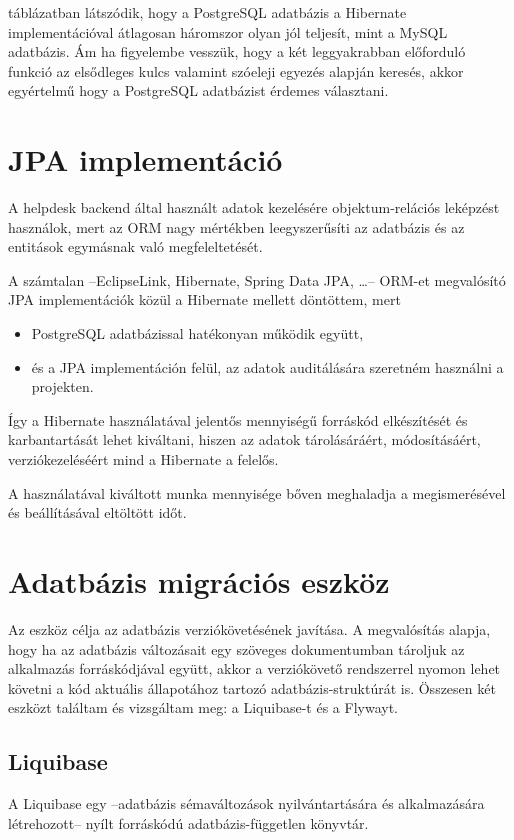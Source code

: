  táblázatban látszódik, hogy a PostgreSQL adatbázis a Hibernate implementációval átlagosan háromszor olyan jól teljesít, mint a MySQL adatbázis. Ám ha figyelembe vesszük, hogy a két leggyakrabban előforduló funkció az elsődleges kulcs valamint szóeleji egyezés alapján keresés, akkor egyértelmű hogy a PostgreSQL adatbázist érdemes választani.


\section{JPA implementáció}
A helpdesk backend által használt adatok kezelésére objektum-relációs leképzést használok, mert az ORM nagy mértékben leegyszerűsíti az adatbázis és az entitások egymásnak való megfeleltetését.


A számtalan --EclipseLink, Hibernate, Spring Data JPA, \dots-- ORM-et megvalósító JPA implementációk közül a Hibernate mellett döntöttem, mert
\begin{itemize}
	\item PostgreSQL adatbázissal hatékonyan működik együtt,
	\item és a JPA implementáción felül, az adatok auditálására szeretném használni a projekten.
\end{itemize}

Így a Hibernate használatával jelentős mennyiségű forráskód elkészítését és karbantartását lehet kiváltani, hiszen az adatok tárolásáráért, módosításáért, verziókezeléséért mind a Hibernate a felelős.

A használatával kiváltott munka mennyisége bőven meghaladja a megismerésével és beállításával eltöltött időt.


\section{Adatbázis migrációs eszköz}
Az eszköz célja az adatbázis verziókövetésének javítása. A megvalósítás alapja, hogy ha az adatbázis változásait egy szöveges dokumentumban tároljuk az alkalmazás forráskódjával együtt, akkor a verziókövető rendszerrel nyomon lehet követni a kód aktuális állapotához tartozó adatbázis-struktúrát is. Összesen két eszközt találtam és vizsgáltam meg: a Liquibase-t és a Flywayt.

\subsection{Liquibase}
A Liquibase egy --adatbázis sémaváltozások nyilvántartására és alkalmazására létrehozott-- nyílt forráskódú adatbázis-független könyvtár.
	
